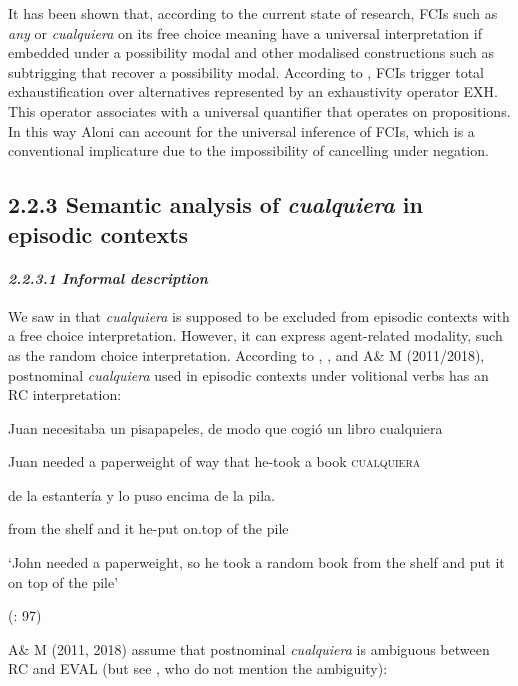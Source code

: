 It has been shown that, according to the current state of research, FCIs such as \textit{any} or \textit{cualquiera} on its free choice meaning have a universal interpretation if embedded under a possibility modal and other modalised constructions such as subtrigging that recover a possibility modal. According to \citet{Aloni2007}, FCIs trigger total exhaustification over alternatives represented by an exhaustivity operator EXH. This operator associates with a universal quantifier that operates on propositions. In this way Aloni can account for the universal inference of FCIs, which is a conventional implicature due to the impossibility of cancelling under negation.

\subsection{\textbf{2.2.3} \textbf{Semantic} \textbf{analysis} \textbf{of} \textbf{\textit{cualquiera}} \textbf{in} \textbf{episodic} \textbf{contexts} }
\paragraph{\textit{2.2.3.1 Informal description}}

We saw in  that \textit{cualquiera} is supposed to be excluded from episodic contexts with a free choice interpretation. However, it can express agent-related modality, such as the random choice interpretation. According to \citet{Choi2007}, \citet{ChoiRomero2008}, and A\& M (2011/2018), postnominal \textit{cualquiera} used in episodic contexts under volitional verbs has an RC interpretation:

  Juan  necesitaba  un  pisapapeles,  de  modo  que  cogió  un  libro  cualquiera

  Juan  needed  a  paperweight  of  way  that  he-took  a  book  \textsc{cualquiera}

  de  la  estantería  y  lo  puso  encima  de  la  pila.  

  from  the  shelf  and  it  he-put  on.top  of  the  pile  

  ‘John needed a paperweight, so he took a random book from the shelf and put it on top of the pile’

  (\citealt{ChoiRomero2008}: 97)

A\& M (2011, 2018) assume that postnominal \textit{cualquiera} is ambiguous between RC and EVAL (but see \citealt{ChoiRomero2008}, who do not mention the ambiguity):

